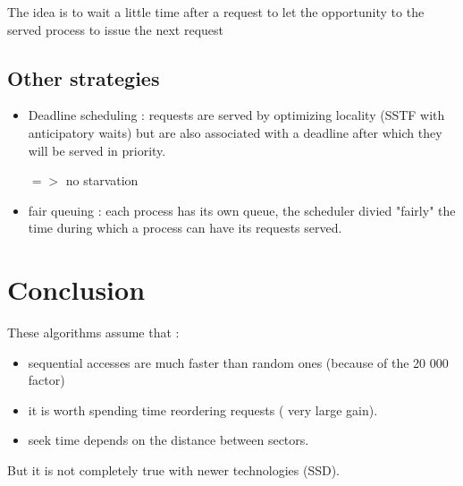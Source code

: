 The idea is to wait a little time after a request to let the opportunity to the served process to issue the next request

\subsection{Other strategies}
\begin{itemize}
  \item Deadline scheduling :
  requests are served by optimizing locality (SSTF with anticipatory waits) but are also associated with a deadline after which they will be served in priority.
  
  $=>$ no starvation
  
  \item fair queuing :
  each process has its own queue, the scheduler divied "fairly" the time during which a process can have its requests served.
\end{itemize}

\section{Conclusion}

These algorithms assume that :
\begin{itemize}
  \item sequential accesses are much faster than random ones (because of the 20 000 factor)
  \item it is worth spending time reordering requests ( very large gain).
  \item seek time depends on the distance between sectors.
\end{itemize}

But it is not completely true with newer technologies (SSD).

